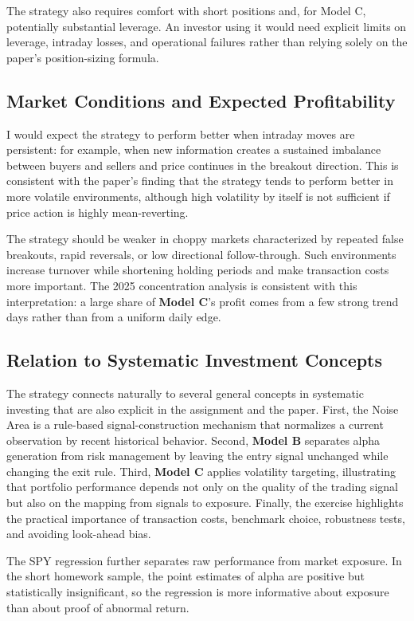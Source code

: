 \documentclass{article}
\begin{document}
The strategy also requires comfort with short positions and, for Model C, potentially substantial leverage. An investor using it would need explicit limits on leverage, intraday losses, and operational failures rather than relying solely on the paper's position-sizing formula.

\subsection{Market Conditions and Expected Profitability}

I would expect the strategy to perform better when intraday moves are persistent: for example, when new information creates a sustained imbalance between buyers and sellers and price continues in the breakout direction. This is consistent with the paper's finding that the strategy tends to perform better in more volatile environments, although high volatility by itself is not sufficient if price action is highly mean-reverting.

The strategy should be weaker in choppy markets characterized by repeated false breakouts, rapid reversals, or low directional follow-through. Such environments increase turnover while shortening holding periods and make transaction costs more important. The 2025 concentration analysis is consistent with this interpretation: a large share of\textbf{ Model C}'s profit comes from a few strong trend days rather than from a uniform daily edge.

\subsection{Relation to Systematic Investment Concepts}

The strategy connects naturally to several general concepts in systematic investing that are also explicit in the assignment and the paper. First, the Noise Area is a rule-based signal-construction mechanism that normalizes a current observation by recent historical behavior. Second,\textbf{ Model B} separates alpha generation from risk management by leaving the entry signal unchanged while changing the exit rule. Third,\textbf{ Model C} applies volatility targeting, illustrating that portfolio performance depends not only on the quality of the trading signal but also on the mapping from signals to exposure. Finally, the exercise highlights the practical importance of transaction costs, benchmark choice, robustness tests, and avoiding look-ahead bias.

The SPY regression further separates raw performance from market exposure. In the short homework sample, the point estimates of alpha are positive but statistically insignificant, so the regression is more informative about exposure than about proof of abnormal return.
\end{document}
